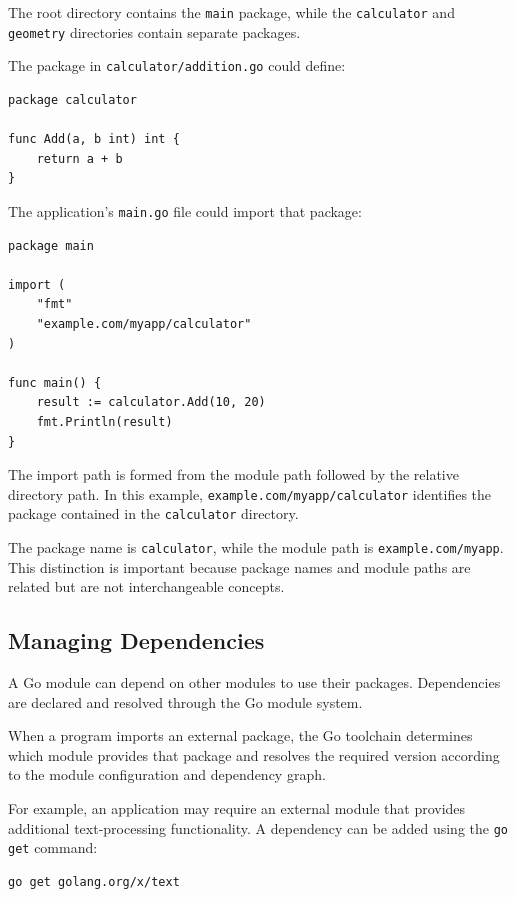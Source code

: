 The root directory contains the \texttt{main} package, while the \texttt{calculator} and \texttt{geometry} directories contain separate packages.

The package in \texttt{calculator/addition.go} could define:

\begin{lstlisting}
package calculator

func Add(a, b int) int {
    return a + b
}
\end{lstlisting}

The application's \texttt{main.go} file could import that package:

\begin{lstlisting}
package main

import (
    "fmt"
    "example.com/myapp/calculator"
)

func main() {
    result := calculator.Add(10, 20)
    fmt.Println(result)
}
\end{lstlisting}

The import path is formed from the module path followed by the relative directory path. In this example, \texttt{example.com/myapp/calculator} identifies the package contained in the \texttt{calculator} directory.

The package name is \texttt{calculator}, while the module path is \texttt{example.com/myapp}. This distinction is important because package names and module paths are related but are not interchangeable concepts.

\subsection{Managing Dependencies}

A Go module can depend on other modules to use their packages. Dependencies are declared and resolved through the Go module system.

When a program imports an external package, the Go toolchain determines which module provides that package and resolves the required version according to the module configuration and dependency graph.

For example, an application may require an external module that provides additional text-processing functionality. A dependency can be added using the \texttt{go get} command:

\begin{lstlisting}
go get golang.org/x/text
\end{lstlisting}

